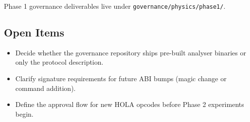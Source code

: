 Phase 1 governance deliverables live under \texttt{governance/physics/phase1/}.

\subsection{Open Items}

\begin{itemize}
  \item Decide whether the governance repository ships pre-built analyser binaries
        or only the protocol description.
  \item Clarify signature requirements for future ABI bumps (magic change or command
        addition).
  \item Define the approval flow for new HOLA opcodes before Phase 2 experiments begin.
\end{itemize}

